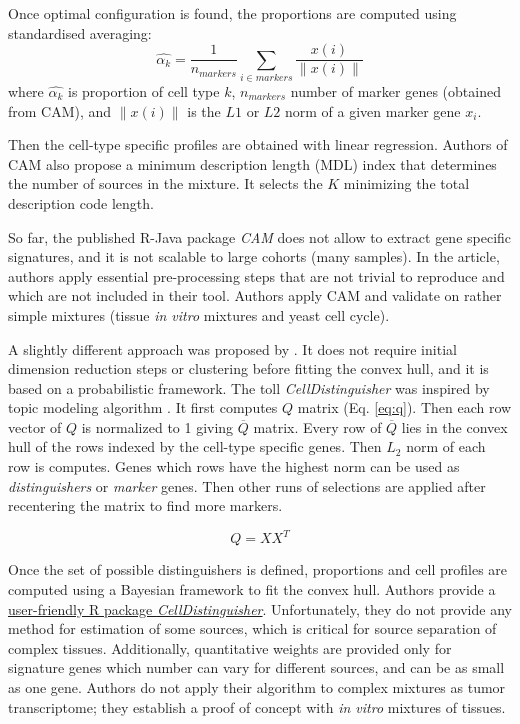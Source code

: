 \documentclass[12pt,]{book}
\theoremstyle{definition}
\theoremstyle{definition}
\theoremstyle{definition}
\theoremstyle{remark}
\begin{document}
Once optimal configuration is found, the proportions are computed using
standardised averaging: \begin{equation}
\hat{\alpha_k} = \frac{1}{n_{markers}} \sum_{i \in markers} \frac {x(i)}{\rVert x(i)\lVert}
\end{equation} where \(\hat{\alpha_k}\) is proportion of cell type
\(k\), \(n_{markers}\) number of marker genes (obtained from CAM), and
\(\rVert x(i)\lVert\) is the \(L1\) or \(L2\) norm of a given marker
gene \(x_i\).

Then the cell-type specific profiles are obtained with linear
regression. Authors of CAM also propose a minimum description length
(MDL) index that determines the number of sources in the mixture. It
selects the \(K\) minimizing the total description code length.

So far, the published R-Java package \emph{CAM} does not allow to
extract gene specific signatures, and it is not scalable to large
cohorts (many samples). In the article, authors apply essential
pre-processing steps that are not trivial to reproduce and which are not
included in their tool. Authors apply CAM and validate on rather simple
mixtures (tissue \emph{in vitro} mixtures and yeast cell cycle).

A slightly different approach was proposed by \citet{Newberg2018}. It
does not require initial dimension reduction steps or clustering before
fitting the convex hull, and it is based on a probabilistic framework.
The toll \emph{CellDistinguisher} was inspired by topic modeling
algorithm \citep{Arora2013}. It first computes \(Q\) matrix (Eq.
\eqref{eq:q}). Then each row vector of \(Q\) is normalized to 1 giving
\(\overline{Q}\) matrix. Every row of \(\overline{Q}\) lies in the
convex hull of the rows indexed by the cell-type specific genes. Then
\(L_2\) norm of each row is computes. Genes which rows have the highest
norm can be used as \emph{distinguishers} or \emph{marker} genes. Then
other runs of selections are applied after recentering the matrix to
find more markers.

\begin{equation}
Q=XX^T \label{eq:q}
\end{equation}

Once the set of possible distinguishers is defined, proportions and cell
profiles are computed using a Bayesian framework to fit the convex hull.
Authors provide a
\href{https://github.com/GeneralElectric/CellDistinguisher}{user-friendly
R package \emph{CellDistinguisher}}. Unfortunately, they do not provide
any method for estimation of some sources, which is critical for source
separation of complex tissues. Additionally, quantitative weights are
provided only for signature genes which number can vary for different
sources, and can be as small as one gene. Authors do not apply their
algorithm to complex mixtures as tumor transcriptome; they establish a
proof of concept with \emph{in vitro} mixtures of tissues.
\end{document}
